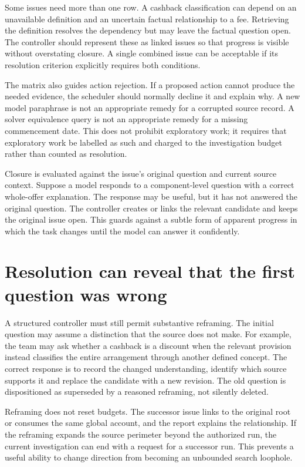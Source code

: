 \documentclass[12pt,a4paper,oneside,openany]{book}
\begin{document}
Some issues need more than one row. A cashback classification can depend on an
unavailable definition and an uncertain factual relationship to a fee. Retrieving
the definition resolves the dependency but may leave the factual question open.
The controller should represent these as linked issues so that progress is visible
without overstating closure. A single combined issue can be acceptable if its
resolution criterion explicitly requires both conditions.

The matrix also guides action rejection. If a proposed action cannot produce the
needed evidence, the scheduler should normally decline it and explain why. A new
model paraphrase is not an appropriate remedy for a corrupted source record. A
solver equivalence query is not an appropriate remedy for a missing commencement
date. This does not prohibit exploratory work; it requires that exploratory work
be labelled as such and charged to the investigation budget rather than counted
as resolution.

Closure is evaluated against the issue's original question and current source
context. Suppose a model responds to a component-level question with a correct
whole-offer explanation. The response may be useful, but it has not answered the
original question. The controller creates or links the relevant candidate and
keeps the original issue open. This guards against a subtle form of apparent
progress in which the task changes until the model can answer it confidently.

\section{Resolution can reveal that the first question was wrong}
\label{merge:M06:10}


A structured controller must still permit substantive reframing. The initial
question may assume a distinction that the source does not make. For example,
the team may ask whether a cashback is a discount when the relevant provision
instead classifies the entire arrangement through another defined concept.
The correct response is to record the changed understanding, identify which
source supports it and replace the candidate with a new revision. The old question
is dispositioned as superseded by a reasoned reframing, not silently deleted.

Reframing does not reset budgets. The successor issue links to the original root
or consumes the same global account, and the report explains the relationship.
If the reframing expands the source perimeter beyond the authorized run, the
current investigation can end with a request for a successor run. This prevents a
useful ability to change direction from becoming an unbounded search loophole.
\end{document}
